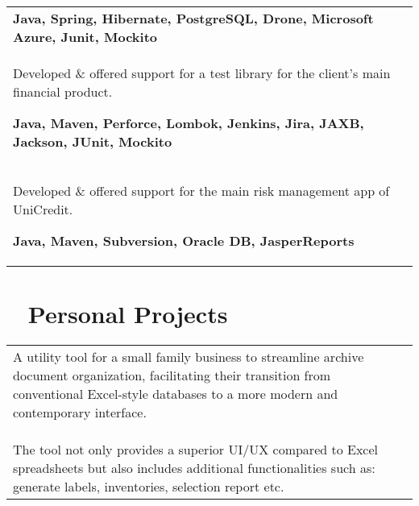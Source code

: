 \documentclass{modernsimplecv}
\newlength{\rightcolwidth}
\newlength{\leftcolwidth}
\begin{document}
\begin{paracol}{2}
{\begin{minipage}[t]{\leftcolwidth}
\begin{tabular}{p{} | p{}}
{                    \textbf{Java, Spring, Hibernate, PostgreSQL, Drone, Microsoft Azure, Junit, Mockito}
                } \\
                \cvevent{2018 -- 2019}{Luxoft}{Backend}{Bucharest, RO}{
                    \color{black!70}\footnotesize Developed \& offered support for a test library for the client's main financial product.\newline

                    \textbf{Java, Maven, Perforce, Lombok, Jenkins, Jira, JAXB, Jackson, JUnit, Mockito}
                } \\
                \cvevent{2015 -- 2018}{Unicredit}{Backend}{Iasi, RO}{
                    \color{black!70}\footnotesize Developed \& offered support for the main risk management app of UniCredit.\newline
                    
                    \color{black!70}\footnotesize \textbf{Java, Maven, Subversion, Oracle DB, JasperReports}
                }
            \end{tabular}
        \end{minipage}
    
    }
        \switchcolumn
    
        \begin{minipage}[t]{\rightcolwidth}
            \small
            \section*{\hspace{1mm}\faLaptop~ Personal Projects} 
            
            \begin{tabular}{p{3em} | p{}}
                \personalproject{2023}{Archive Utilitary}{
                    \color{black!70}\footnotesize A utility tool for a small family business to streamline archive document organization, facilitating their transition from conventional Excel-style databases to a more modern and contemporary interface.\newline\newline
                    \color{black!70}\footnotesize The tool not only provides a superior UI/UX compared to Excel spreadsheets but also includes additional functionalities such as: generate labels, inventories, selection report etc.
                } \\
            \end{tabular}
        

\end{minipage}
\end{paracol}
\end{document}
